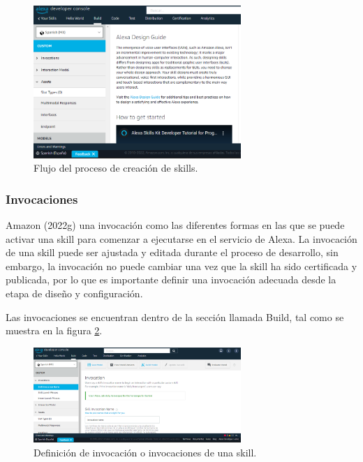 \begin{figure}
  \centering
  \includegraphics[width=0.70\textwidth]{Cap4/Figuras/Proceso de creacion de skill.png}
  \caption{Flujo del proceso de creación de skills.}
  \label{fig:44}
\end{figure}


\subsubsection{Invocaciones}
\label{InvocacionescapIV}

Amazon (2022g) una invocación como las diferentes formas en las que se puede activar una skill para comenzar a ejecutarse en el servicio de Alexa. La invocación de una skill puede ser ajustada y editada durante el proceso de desarrollo, sin embargo, la invocación no puede cambiar una vez que la skill ha sido certificada y publicada, por lo que es importante definir una invocación adecuada desde la etapa de diseño y configuración.

Las invocaciones se encuentran dentro de la sección llamada Build, tal como se muestra en la figura \ref{fig:45}.

\begin{figure}
  \centering
  \includegraphics[width=0.70\textwidth]{Cap4/Figuras/Invocaciones.png}
  \caption{Definición de invocación o invocaciones de una skill.}
  \label{fig:45}
\end{figure}

